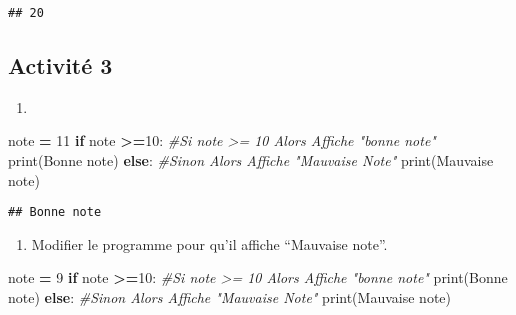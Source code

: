 \documentclass[
]{book}
\newenvironment{Shaded}{\begin{snugshade}}{\end{snugshade}}
\newcommand{\BuiltInTok}[1]{#1}
\newcommand{\CommentTok}[1]{\textcolor[rgb]{0.56,0.35,0.01}{\textit{#1}}}
\newcommand{\ControlFlowTok}[1]{\textcolor[rgb]{0.13,0.29,0.53}{\textbf{#1}}}
\newcommand{\DecValTok}[1]{\textcolor[rgb]{0.00,0.00,0.81}{#1}}
\newcommand{\NormalTok}[1]{#1}
\newcommand{\OperatorTok}[1]{\textcolor[rgb]{0.81,0.36,0.00}{\textbf{#1}}}
\newcommand{\StringTok}[1]{\textcolor[rgb]{0.31,0.60,0.02}{#1}}
\providecommand{\tightlist}{%
  \setlength{\itemsep}{0pt}\setlength{\parskip}{0pt}}
\def\tightlist{}
\begin{document}
\begin{verbatim}
## 20
\end{verbatim}

\hypertarget{activituxe9-3}{%
\subsection{Activité 3}\label{activituxe9-3}}

\begin{enumerate}
\def\labelenumi{\arabic{enumi}.}
\tightlist
\item
\end{enumerate}

\begin{Shaded}
\begin{Highlighting}[]
\NormalTok{note }\OperatorTok{=} \DecValTok{11}
\ControlFlowTok{if}\NormalTok{ note }\OperatorTok{\textgreater{}=}\DecValTok{10}\NormalTok{:  }\CommentTok{\#Si note \textgreater{}= 10 Alors Affiche "bonne note"}
  \BuiltInTok{print}\NormalTok{(}\StringTok{\textquotesingle{}Bonne note\textquotesingle{}}\NormalTok{)}
\ControlFlowTok{else}\NormalTok{:  }\CommentTok{\#Sinon Alors Affiche "Mauvaise Note"}
  \BuiltInTok{print}\NormalTok{(}\StringTok{\textquotesingle{}Mauvaise note\textquotesingle{}}\NormalTok{)}
\end{Highlighting}
\end{Shaded}

\begin{verbatim}
## Bonne note
\end{verbatim}

\begin{enumerate}
\def\labelenumi{\arabic{enumi}.}
\setcounter{enumi}{1}
\tightlist
\item
  Modifier le programme pour qu'il affiche ``Mauvaise note''.
\end{enumerate}

\begin{Shaded}
\begin{Highlighting}[]
\NormalTok{note }\OperatorTok{=} \DecValTok{9}
\ControlFlowTok{if}\NormalTok{ note }\OperatorTok{\textgreater{}=}\DecValTok{10}\NormalTok{:  }\CommentTok{\#Si note \textgreater{}= 10 Alors Affiche "bonne note"}
  \BuiltInTok{print}\NormalTok{(}\StringTok{\textquotesingle{}Bonne note\textquotesingle{}}\NormalTok{)}
\ControlFlowTok{else}\NormalTok{:  }\CommentTok{\#Sinon Alors Affiche "Mauvaise Note"}
  \BuiltInTok{print}\NormalTok{(}\StringTok{\textquotesingle{}Mauvaise note\textquotesingle{}}\NormalTok{)}
\end{Highlighting}
\end{Shaded}
\end{document}
